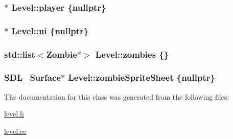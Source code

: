 \hypertarget{classLevel_a76b010ccc524cef1ae0c3adc2a63d3b1}{
\subsubsection[{player}]{$\ast$ Level\-::player \{nullptr\}\hspace{0.3cm}{\ttfamily [protected]}}}\label{classLevel_a76b010ccc524cef1ae0c3adc2a63d3b1}
\hypertarget{classLevel_aefdedc06660278bcea9e0d06460af308}{
\subsubsection[{ui}]{$\ast$ Level\-::ui \{nullptr\}\hspace{0.3cm}{\ttfamily [protected]}}}\label{classLevel_aefdedc06660278bcea9e0d06460af308}
\hypertarget{classLevel_a507f4b9bc3a1b4acf67c8857a942f584}{
\subsubsection[{zombies}]{\setlength{\rightskip}{0pt plus 5cm}std\-::list$<${\bf Zombie}$\ast$$>$ Level\-::zombies \{\}\hspace{0.3cm}{\ttfamily [protected]}}}\label{classLevel_a507f4b9bc3a1b4acf67c8857a942f584}
\hypertarget{classLevel_af0f53f17e06a467013d4612c13bbdc68}{
\subsubsection[{zombie\-Sprite\-Sheet}]{\setlength{\rightskip}{0pt plus 5cm}S\-D\-L\-\_\-\-Surface$\ast$ Level\-::zombie\-Sprite\-Sheet \{nullptr\}\hspace{0.3cm}{\ttfamily [protected]}}}\label{classLevel_af0f53f17e06a467013d4612c13bbdc68}


The documentation for this class was generated from the following files\-:\begin{DoxyCompactItemize}
\item 
\hyperlink{level_8h}{level.\-h}\item 
\hyperlink{level_8cc}{level.\-cc}\end{DoxyCompactItemize}
